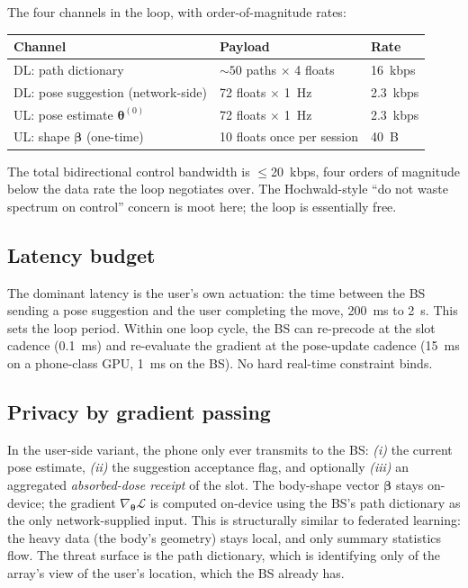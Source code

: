 \documentclass[11pt,a4paper]{article}
\theoremstyle{definition}
\newcommand{\thetab}{\bm{\theta}}
\newcommand{\betab}{\bm{\beta}}
\begin{document}
The four channels in the loop, with order-of-magnitude rates:

\begin{center}
\begin{tabular}{lll}
\toprule
\textbf{Channel} & \textbf{Payload} & \textbf{Rate} \\
\midrule
DL: path dictionary               & $\sim 50$ paths $\times$ 4 floats        & \SI{16}{kbps} \\
DL: pose suggestion (network-side) & 72 floats $\times$ \SI{1}{Hz}            & \SI{2.3}{kbps} \\
UL: pose estimate $\thetab^{(0)}$  & 72 floats $\times$ \SI{1}{Hz}            & \SI{2.3}{kbps} \\
UL: shape $\betab$ (one-time)      & 10 floats once per session              & \SI{40}{B} \\
\bottomrule
\end{tabular}
\end{center}

The total bidirectional control bandwidth is
$\le$\SI{20}{kbps}, four orders of magnitude below the data rate
the loop negotiates over.  The Hochwald-style ``do not waste
spectrum on control'' concern is moot here; the loop is essentially
free.

\subsection{Latency budget}

The dominant latency is the user's own actuation: the time between
the BS sending a pose suggestion and the user completing the move,
\SI{200}{ms} to \SI{2}{s}.  This sets the loop period.  Within one
loop cycle, the BS can re-precode at the slot cadence (\SI{0.1}{ms})
and re-evaluate the gradient at the pose-update cadence
(\SI{15}{ms} on a phone-class GPU, \SI{1}{ms} on the BS).  No
hard real-time constraint binds.

\subsection{Privacy by gradient passing}\label{sec:privacy}

In the user-side variant, the phone only ever transmits to the BS:
\emph{(i)} the current pose estimate, \emph{(ii)} the suggestion
acceptance flag, and optionally \emph{(iii)} an aggregated
\emph{absorbed-dose receipt} of the slot.  The body-shape vector
$\betab$ stays on-device; the gradient $\nabla_\thetab\mathcal{L}$
is computed on-device using the BS's path dictionary as the only
network-supplied input.  This is structurally similar to federated
learning: the heavy data (the body's geometry) stays local, and
only summary statistics flow.  The threat surface is the path
dictionary, which is identifying only of the array's view of the
user's location, which the BS already has.
\end{document}
